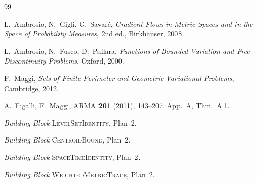 \documentclass[11pt]{article}
\theoremstyle{definition}
\begin{document}
\begin{thebibliography}{99}

L.~Ambrosio, N.~Gigli, G.~Savar\'e,
\emph{Gradient Flows in Metric Spaces and in the Space of Probability
Measures}, 2nd ed., Birkh\"auser, 2008.

L.~Ambrosio, N.~Fusco, D.~Pallara,
\emph{Functions of Bounded Variation and Free Discontinuity Problems},
Oxford, 2000.

F.~Maggi, \emph{Sets of Finite Perimeter and Geometric Variational
Problems}, Cambridge, 2012.

A.~Figalli, F.~Maggi, ARMA \textbf{201} (2011), 143--207. App.~A, Thm.~A.1.

\emph{Building Block} \textsc{LevelSetIdentity}, Plan~2.

\emph{Building Block} \textsc{CentroidBound}, Plan~2.

\emph{Building Block} \textsc{SpaceTimeIdentity}, Plan~2.

\emph{Building Block} \textsc{WeightedMetricTrace}, Plan~2.

\end{thebibliography}
\end{document}
